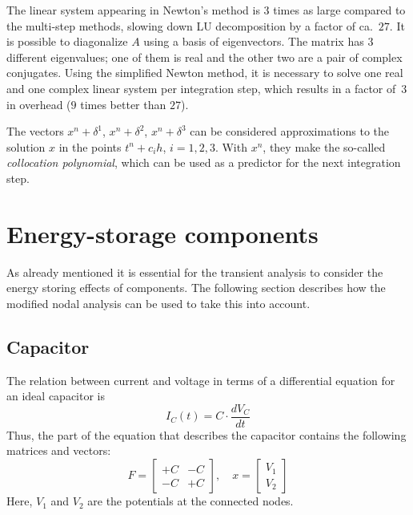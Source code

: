 The linear system appearing in Newton's method is $3$ times as large
compared to the multi-step methods, slowing down LU decomposition by a
factor of ca.~$27$.  It is possible to diagonalize $A$ using a basis
of eigenvectors.  The matrix has $3$ different eigenvalues; one of
them is real and the other two are a pair of complex conjugates.
Using the simplified Newton method, it is necessary to solve one real
and one complex linear system per integration step, which results in a
factor of~$3$ in overhead ($9$ times better than $27$).

The vectors $x^n+\delta^1$, $x^n+\delta^2$, $x^n+\delta^3$ can be
considered approximations to the solution $x$ in the points
$t^n+c_ih$, $i=1,2,3$.  With $x^n$, they make the so-called
\emph{collocation polynomial}, which can be used as a predictor for
the next integration step.

\section{Energy-storage components}

As already mentioned it is essential for the transient analysis to
consider the energy storing effects of components.  The following
section describes how the modified nodal analysis can be used to take
this into account.

\subsection{Capacitor}

The relation between current and voltage in terms of a differential
equation for an ideal capacitor is
\begin{equation}
\label{eq:ConstCap}
I_C(t) = C\cdot \dfrac{d V_C}{d t}
\end{equation}
Thus, the part of the equation that describes the capacitor contains
the following matrices and vectors:
\begin{equation}
F=
\begin{bmatrix}
+C & -C\\
-C & +C
\end{bmatrix},\quad
x=
\begin{bmatrix}
V_1\\
V_2
\end{bmatrix}
\end{equation}
Here, $V_1$ and $V_2$ are the potentials at the connected nodes.

